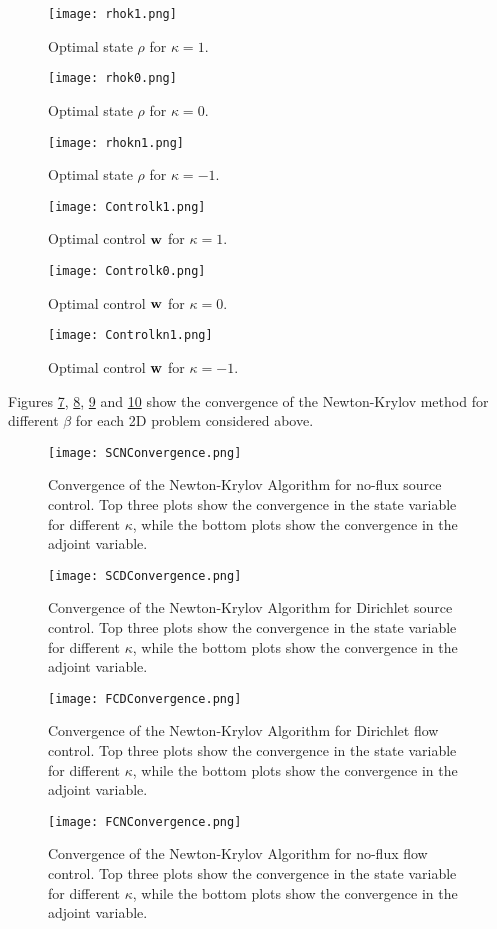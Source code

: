 \begin{figure}[h]
	\centering
	\texttt{[image: rhok1.png]}
	\caption{Optimal state $\rho$ for $\kappa = 1$.} 
	\label{F2}
\end{figure}
\begin{figure}[h]
	\centering
	\texttt{[image: rhok0.png]}
	\caption{Optimal state $\rho$ for $\kappa = 0$.} 
	\label{F3}
\end{figure}
\begin{figure}[h]
	\centering
	\texttt{[image: rhokn1.png]}
	\caption{Optimal state $\rho$ for $\kappa = -1$.} 
	\label{F4}
\end{figure}
%	
\begin{figure}[h]
	\centering
	\texttt{[image: Controlk1.png]}
	\caption{Optimal control $\mathbf{w}$ for $\kappa = 1$.} 
	\label{F5}
\end{figure}
\begin{figure}[h]
	\centering
	\texttt{[image: Controlk0.png]}
	\caption{Optimal control $\mathbf{w}$ for $\kappa = 0$.} 
	\label{F6}
\end{figure}
\begin{figure}[h]
	\centering
	\texttt{[image: Controlkn1.png]}
	\caption{Optimal control $\mathbf{w}$ for $\kappa = -1$.} 
	\label{F7}
\end{figure}

Figures \ref{Con1}, \ref{Con2}, \ref{Con3} and \ref{Con4} show the convergence of the Newton-Krylov method for different $\beta$ for each 2D problem considered above.

\begin{figure}[h]
	\centering
	\texttt{[image: SCNConvergence.png]}
	\caption{Convergence of the Newton-Krylov Algorithm for no-flux source control. Top three plots show the convergence in the state variable for different $\kappa$, while the bottom plots show the convergence in the adjoint variable.} 
	\label{Con1}
\end{figure}
\begin{figure}[h]
	\centering
	\texttt{[image: SCDConvergence.png]}
	\caption{Convergence of the Newton-Krylov Algorithm for Dirichlet source control. Top three plots show the convergence in the state variable for different $\kappa$, while the bottom plots show the convergence in the adjoint variable.} 
	\label{Con2}
\end{figure}
\begin{figure}[h]
	\centering
	\texttt{[image: FCDConvergence.png]}
	\caption{Convergence of the Newton-Krylov Algorithm for Dirichlet flow control. Top three plots show the convergence in the state variable for different $\kappa$, while the bottom plots show the convergence in the adjoint variable.} 
	\label{Con3}
\end{figure}
\begin{figure}[h]
	\centering
	\texttt{[image: FCNConvergence.png]}
	\caption{Convergence of the Newton-Krylov Algorithm for no-flux flow control. Top three plots show the convergence in the state variable for different $\kappa$, while the bottom plots show the convergence in the adjoint variable.} 
	\label{Con4}
\end{figure}